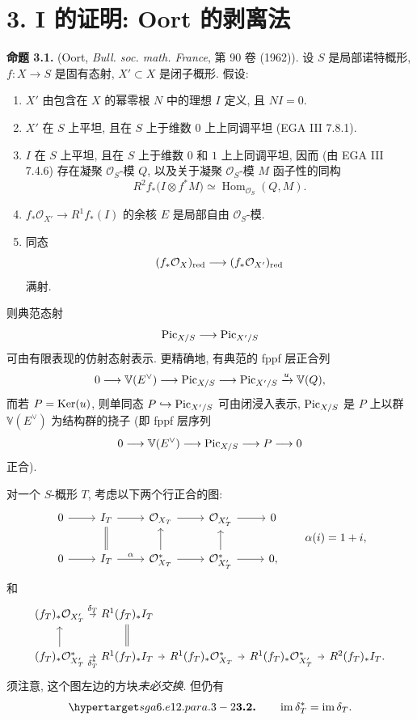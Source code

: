 \section*{3. I 的证明: Oort 的剥离法}

\textbf{命题 3.1.} (Oort, \emph{Bull. soc. math. France}, 第 90 卷 (1962)). 设 $S$ 是局部诺特概形, $f:X\to S$ 是固有态射, $X'\subset X$ 是闭子概形. 假设:
\begin{enumerate}[label=\roman*)]
\item $X'$ 由包含在 $X$ 的幂零根 $N$ 中的理想 $I$ 定义, 且 $NI=0$.
\item $X'$ 在 $S$ 上平坦, 且在 $S$ 上于维数 $0$ 上上同调平坦 (EGA III 7.8.1).
\item $I$ 在 $S$ 上平坦, 且在 $S$ 上于维数 $0$ 和 $1$ 上上同调平坦, 因而 (由 EGA III 7.4.6) 存在凝聚 $\mathcal O_S$-模 $Q$, 以及关于凝聚 $\mathcal O_S$-模 $M$ 函子性的同构
\[
  R^2f_*\bigl(I\otimes f^*M\bigr)
  \simeq\operatorname{Hom}_{\mathcal O_S}(Q,M).
\]
\item $f_*\mathcal O_{X'}\to R^1f_*(I)$ 的余核 $E$ 是局部自由 $\mathcal O_S$-模.
\item 同态
  \[
    (f_*\mathcal O_X)_{\mathrm{red}}
    \longrightarrow(f_*\mathcal O_{X'})_{\mathrm{red}}
  \]
  满射.
\end{enumerate}
则典范态射
\[
  \operatorname{Pic}_{X/S}\longrightarrow\operatorname{Pic}_{X'/S}
\]
可由有限表现的仿射态射表示. 更精确地, 有典范的 fppf 层正合列
\[
  0\longrightarrow\mathbb V(E^\vee)\longrightarrow\operatorname{Pic}_{X/S}
  \longrightarrow\operatorname{Pic}_{X'/S}\xrightarrow{u}\mathbb V(Q),
\]
而若 $P=\operatorname{Ker}(u)$, 则单同态 $P\hookrightarrow\operatorname{Pic}_{X'/S}$ 可由闭浸入表示, $\operatorname{Pic}_{X/S}$ 是 $P$ 上以群 $\mathbb V(E^\vee)$ 为结构群的挠子 (即 fppf 层序列
\[
  0\longrightarrow\mathbb V(E^\vee)\longrightarrow\operatorname{Pic}_{X/S}
  \longrightarrow P\longrightarrow0
\]
正合).

对一个 $S$-概形 $T$, 考虑以下两个行正合的图:
\[
\begin{tikzcd}
0 \arrow[r] & I_T \arrow[r] & \mathcal O_{X_T} \arrow[r] &
  \mathcal O_{X'_T} \arrow[r] & 0\\
0 \arrow[r] & I_T \arrow[r,"\alpha"] \arrow[u,equal] &
  \mathcal O_{X_T}^{*} \arrow[r] \arrow[u] &
  \mathcal O_{X'_T}^{*} \arrow[r] \arrow[u] & 0,
\end{tikzcd}
\qquad \alpha(i)=1+i,
\]
和
\[
\begin{tikzcd}[column sep=tiny]
(f_T)_*\mathcal O_{X'_T} \arrow[r,"\delta_T"] &
  R^1(f_T)_*I_T \arrow[d,equal]\\
(f_T)_*\mathcal O_{X'_T}^{*} \arrow[r,"\delta_T^*"'] \arrow[u] &
  R^1(f_T)_*I_T \arrow[r] &
  R^1(f_T)_*\mathcal O_{X_T}^{*} \arrow[r] &
  R^1(f_T)_*\mathcal O_{X'_T}^{*} \arrow[r] &
  R^2(f_T)_*I_T.
\end{tikzcd}
\]
须注意, 这个图左边的方块\emph{未必交换}. 但仍有
\[
  \sgaStableTarget{sga6.e12.para.3-2}\textbf{3.2.}\qquad \operatorname{im}\delta_T^*
  =\operatorname{im}\delta_T.
\]

